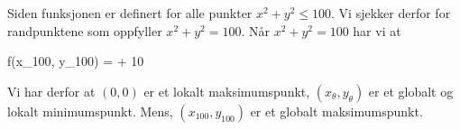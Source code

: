 Siden funksjonen er definert for alle punkter $x^2 + y^2 \leq 100$. Vi sjekker derfor for randpunktene som oppfyller $x^2 + y^2 = 100$. Når $x^2 + y^2 = 100$ har vi at
\begin{likning}
	f(x_{100}, y_{100}) =  + 10 
\end{likning}

Vi har derfor at $(0,0)$ er et lokalt maksimumspunkt, $(x_\theta, y_\theta)$ er et globalt og lokalt minimumspunkt. Mens, $(x_{100}, y_{100})$ er et globalt maksimumspunkt.
\clearpage